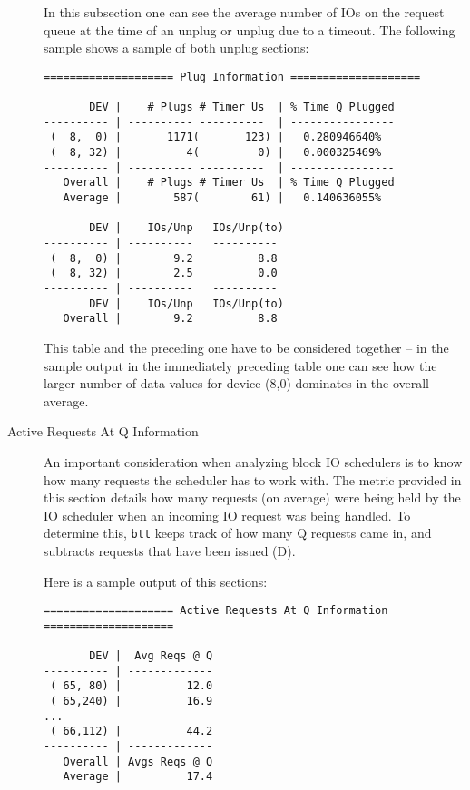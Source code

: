 \documentclass{article}
\begin{document}
\begin{description}
  In this subsection one can see the average number of IOs on the request
  queue at the time of an unplug or unplug due to a timeout. The following
  sample shows a sample of both unplug sections:

\begin{verbatim}
==================== Plug Information ====================

       DEV |    # Plugs # Timer Us  | % Time Q Plugged
---------- | ---------- ----------  | ----------------
 (  8,  0) |       1171(       123) |   0.280946640%
 (  8, 32) |          4(         0) |   0.000325469%
---------- | ---------- ----------  | ----------------
   Overall |    # Plugs # Timer Us  | % Time Q Plugged
   Average |        587(        61) |   0.140636055%

       DEV |    IOs/Unp   IOs/Unp(to)
---------- | ----------   ----------
 (  8,  0) |        9.2          8.8
 (  8, 32) |        2.5          0.0
---------- | ----------   ----------
       DEV |    IOs/Unp   IOs/Unp(to)
   Overall |        9.2          8.8
\end{verbatim}

  This table and the preceding one have to be considered together --
  in the sample output in the immediately preceding table one can see
  how the larger number of data values for device (8,0) dominates in
  the overall average.

  \item[Active Requests At Q Information]

  An important consideration when analyzing block IO schedulers is to
  know how many requests the scheduler has to work with. The metric
  provided in this section details how many requests (on average) were
  being held by the IO scheduler when an incoming IO request was being
  handled. To determine this, \texttt{btt} keeps track of how many Q
  requests came in, and subtracts requests that have been issued (D).

  Here is a sample output of this sections:

\begin{verbatim}
==================== Active Requests At Q Information ====================

       DEV |  Avg Reqs @ Q
---------- | -------------
 ( 65, 80) |          12.0
 ( 65,240) |          16.9
...
 ( 66,112) |          44.2
---------- | -------------
   Overall | Avgs Reqs @ Q
   Average |          17.4
\end{verbatim}

\end{description}
\end{document}
